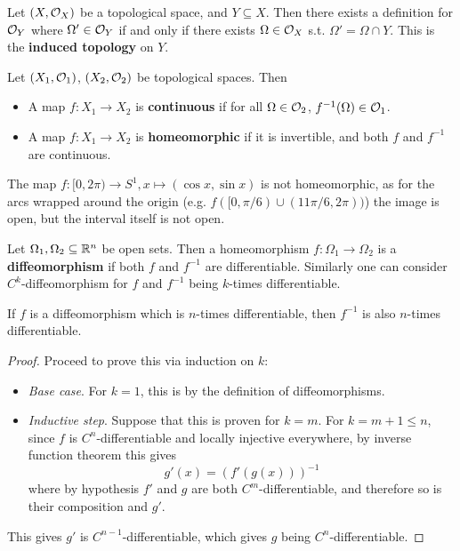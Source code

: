 \documentclass{article}
\begin{document}
\begin{definition}
    Let $(X, \mathcal{O}_X)$ be a topological space, and $Y \subseteq X$. Then there exists a definition for $\mathcal{O}_Y$ where $\Omega' \in \mathcal{O}_Y$ if and only if there exists $\Omega \in \mathcal{O}_X$ s.t. $\Omega' = \Omega \cap Y$. This is the \textbf{induced topology} on $Y$.
\end{definition}

\begin{definition}
    Let $(X_1, \mathcal{O}_1)$, $(X_2, \mathcal{O}_2)$ be topological spaces. Then
    \begin{itemize}
        \item A map $f: X_1 \to X_2$ is \textbf{continuous} if for all $\Omega \in \mathcal{O}_2$, $f^{-1}(\Omega) \in \mathcal{O}_1$. 
        \item A map $f: X_1 \to X_2$ is \textbf{homeomorphic} if it is invertible, and both $f$ and $f^{-1}$ are continuous. 
    \end{itemize}
\end{definition}

\begin{example}
    The map $f: [0, 2\pi) \to S^1, x \mapsto (\cos x, \sin x)$ is not homeomorphic, as for the arcs wrapped around the origin (e.g. $f([0, \pi/6) \cup (11\pi/6, 2\pi))$) the image is open, but the interval itself is not open.
\end{example}

\begin{definition}[Diffeomorphism]
    Let $\Omega_1, \Omega_2 \subseteq \mathbb{R}^n$ be open sets. Then a homeomorphism $f: \Omega_1 \to \Omega_2$ is a \textbf{diffeomorphism} if both $f$ and $f^{-1}$ are differentiable. Similarly one can consider $C^k$-diffeomorphism for $f$ and $f^{-1}$ being $k$-times differentiable.
\end{definition}

\begin{proposition}
    If $f$ is a diffeomorphism which is $n$-times differentiable, then $f^{-1}$ is also $n$-times differentiable.
\end{proposition}

\begin{proof}
    Proceed to prove this via induction on $k$:
    \begin{itemize}
        \item \emph{Base case}. For $k = 1$, this is by the definition of diffeomorphisms.
        \item \emph{Inductive step}. Suppose that this is proven for $k = m$. For $k = m+1 \leq n$, since $f$ is $C^n$-differentiable and locally injective everywhere, by inverse function theorem this gives
        \[
            g'(x) = (f'(g(x)))^{-1}
        \]
        where by hypothesis $f'$ and $g$ are both $C^m$-differentiable, and therefore so is their composition and $g'$.
    \end{itemize}
    This gives $g'$ is $C^{n-1}$-differentiable, which gives $g$ being $C^n$-differentiable.
\end{proof}
\end{document}

